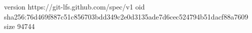 version https://git-lfs.github.com/spec/v1
oid sha256:76d469f887c51c856703bdd349c2e0d3135ade7d6cec524794b51dacf88a7609
size 94744
